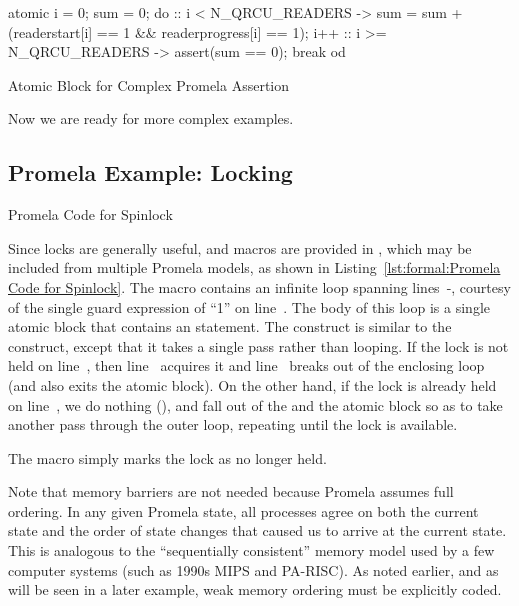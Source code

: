 \begin{listing}[tbp]
\begin{VerbatimL}
atomic {
	i = 0;
	sum = 0;
	do
	:: i < N_QRCU_READERS ->
		sum = sum + (readerstart[i] == 1 &&
		             readerprogress[i] == 1);
		i++
	:: i >= N_QRCU_READERS ->
		assert(sum == 0);
		break
	od
}
\end{VerbatimL}
\caption{Atomic Block for Complex Promela Assertion}
\label{lst:formal:Atomic Block for Complex Promela Assertion}
\end{listing}

Now we are ready for more complex examples.

\subsection{Promela Example: Locking}
\label{sec:formal:Promela Example: Locking}
\NoIndentAfterThis

\begin{listing}[tbp]

\caption{Promela Code for Spinlock}
\label{lst:formal:Promela Code for Spinlock}
\end{listing}

\begin{lineref}
Since locks are generally useful,  and
macros are provided in , which may be included from
multiple Promela models, as shown in
Listing~\ref{lst:formal:Promela Code for Spinlock}.
The  macro contains an infinite  loop
spanning lines~-,
courtesy of the single guard expression of ``1'' on line~.
The body of this loop is a single atomic block that contains
an  statement.
The  construct is similar to the  construct, except
that it takes a single pass rather than looping.
If the lock is not held on line~, then
line~ acquires it and
line~ breaks out of the enclosing  loop (and also exits
the atomic block).
On the other hand, if the lock is already held on line~,
we do nothing (), and fall out of the  and the
atomic block so as to take another pass through the outer
loop, repeating until the lock is available.
\end{lineref}

The  macro simply marks the lock as no
longer held.

Note that memory barriers are not needed because Promela assumes
full ordering.
In any given Promela state, all processes agree on both the current
state and the order of state changes that caused us to arrive at
the current state.
This is analogous to the ``sequentially consistent'' memory model
used by a few computer systems (such as 1990s MIPS and PA-RISC).
As noted earlier, and as will be seen in a later example,
weak memory ordering must be explicitly coded.

